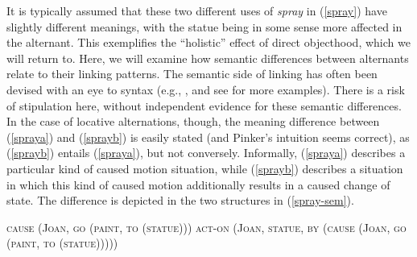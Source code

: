 \documentclass[output=paper
 	        ,biblatex
                ,babelshorthands
                ,newtxmath
                ,draftmode
                ,colorlinks, citecolor=brown
]{langscibook}
\begin{document}
\noindent
It is typically assumed that these two different uses of \textit{spray} in (\ref{spray}) have
slightly different meanings, with the statue being in some sense more affected in the 
alternant.  This exemplifies the ``holistic'' effect of direct objecthood, which we will return to.  Here, we will examine how semantic differences
between alternants relate to their linking patterns.  The semantic side of linking has often been
devised with an eye to syntax (e.g., \citealt{Pinker1989}, and see \citealt{KoenigandDavis2006} for
more examples).  There is a risk of stipulation here, without independent evidence for these
semantic differences.  In the case of locative alternations, though, the meaning difference between
(\ref{spraya}) and (\ref{sprayb}) is easily stated (and Pinker's intuition seems correct), as
(\ref{sprayb}) entails (\ref{spraya}), but not conversely.  Informally, (\ref{spraya}) describes a
particular kind of caused motion situation, while (\ref{sprayb}) describes a situation in which
this kind of caused motion additionally results in a caused change of state.  The difference is
depicted in the two structures in (\ref{spray-sem}).

\begin{exe}\ex\label{spray-sem}
\begin{xlist}
\ex \label{spray-sema} \textsc{cause (Joan, go (paint, to (statue)))}
\ex \label{spray-semb} \textsc{act-on (Joan, statue, by (cause (Joan, go (paint, to (statue)))))}
\end{xlist}
\end{exe}
\end{document}
